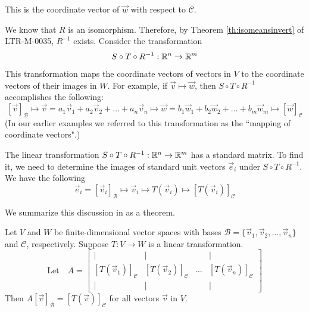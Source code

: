 \documentclass{ximera}
\begin{document}
This is the coordinate vector of $\vec{w}$ with respect to $\mathcal{C}$.

We know that $R$ is an isomorphism.  Therefore, by Theorem \ref{th:isomeansinvert} of LTR-M-0035, $R^{-1}$ exists. Consider the transformation
$$S\circ T\circ R^{-1}:\mathbb{R}^n\rightarrow \mathbb{R}^m$$

\begin{center}
\end{center}

This transformation maps the coordinate vectors of vectors in $V$ to the coordinate vectors of their images in $W$.  For example, if $\vec{v}\mapsto\vec{w}$, then $S\circ T\circ R^{-1}$ accomplishes the following:
$$[\vec{v}]_{\mathcal{B}}\mapsto\vec{v}=a_1\vec{v}_1+a_2\vec{v}_2+\ldots +a_n\vec{v}_n\mapsto\vec{w}=b_1\vec{w}_1+b_2\vec{w}_2+\ldots +b_m\vec{w}_m\mapsto[\vec{w}]_{\mathcal{C}}$$
(In our earlier examples we referred to this transformation as the ``mapping of coordinate vectors".)

The linear transformation $S\circ T\circ R^{-1}:\mathbb{R}^n\rightarrow \mathbb{R}^m$ has a standard matrix.  To find it, we need to determine the images of standard unit vectors $\vec{e}_i$ under $S\circ T\circ R^{-1}$. We have the following
$$\vec{e}_i=[\vec{v}_i]_{\mathcal{B}}\mapsto \vec{v}_i \mapsto T(\vec{v}_i)\mapsto [T(\vec{v}_i)]_{\mathcal{C}}$$

We summarize this discussion in as a theorem.

\begin{theorem}\label{th:matlintransgeneral}
Let $V$ and $W$ be finite-dimensional vector spaces with bases $\mathcal{B}=\{\vec{v}_1,\vec{v}_2,\ldots,\vec{v}_n\}$ and $\mathcal{C}$, respectively.  Suppose $T:V\rightarrow W$ is a linear transformation.  
$$\text{Let}\quad A=\begin{bmatrix}
           | & |& &|\\
		[T(\vec{v}_1)]_{\mathcal{C}} & [T(\vec{v}_2)]_{\mathcal{C}}&\dots &[T(\vec{v}_n)]_{\mathcal{C}}\\
		|&| & &|
         \end{bmatrix}$$
Then $A[\vec{v}]_{\mathcal{B}}=[T(\vec{v})]_{\mathcal{C}}$ for all vectors $\vec{v}$ in $V$.       
\end{theorem}
\end{document}
